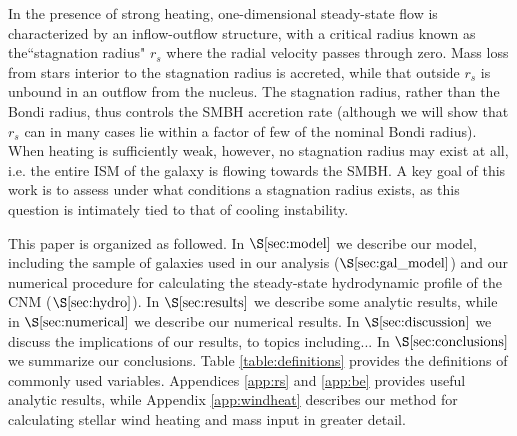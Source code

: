\documentclass[usenatbib,fleqn]{mn2e}
\newcommand{\rs}{r_s}
\begin{document}
In the presence of strong heating, one-dimensional steady-state flow
is characterized by an inflow-outflow structure, with a critical
radius known as the``stagnation radius" $\rs$ where the radial
velocity passes through zero.  Mass loss from stars interior to the
stagnation radius is accreted, while that outside $\rs$ is unbound in
an outflow from the nucleus.  The stagnation radius, rather than the
Bondi radius, thus controls the SMBH accretion rate (although we will
show that $\rs$ can in many cases lie within a factor of few of the
nominal Bondi radius).  When heating is sufficiently weak, however, no stagnation radius may exist at all, i.e. the entire ISM of the galaxy is flowing towards the SMBH.  A key goal of this work is to
assess under what conditions a stagnation radius exists, as this
question is intimately tied to that of cooling instability.


This paper is organized as followed.  In $\S\ref{sec:model}$ we
describe our model, including the sample of galaxies used in our
analysis ($\S\ref{sec:gal_model}$) and our numerical procedure for
calculating the steady-state hydrodynamic profile of the CNM
($\S\ref{sec:hydro}$).  In $\S\ref{sec:results}$ we describe some
analytic results, while in $\S\ref{sec:numerical}$ we describe our
numerical results.  In $\S\ref{sec:discussion}$ we discuss the
implications of our results, to topics including...  In
$\S\ref{sec:conclusions}$ we summarize our conclusions.  Table
\ref{table:definitions} provides the definitions of commonly used
variables.  Appendices \ref{app:rs} and \ref{app:be} provides useful
analytic results, while Appendix \ref{app:windheat} describes our
method for calculating stellar wind heating and mass input in greater
detail.
\end{document}
